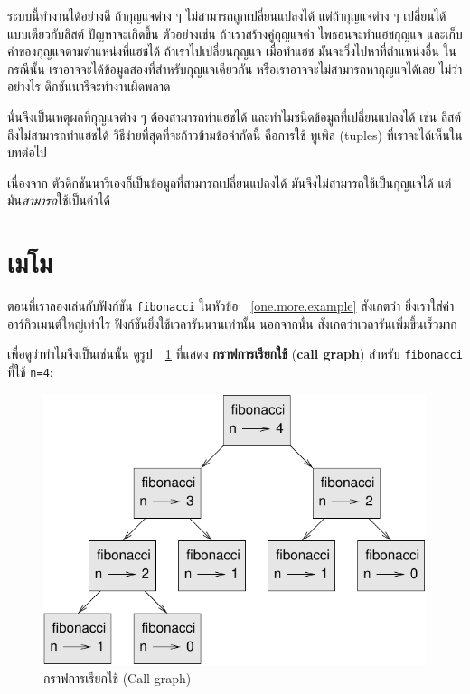ระบบนี้ทำงานได้อย่างดี ถ้ากุญแจต่าง ๆ ไม่สามารถถูกเปลี่ยนแปลงได้
แต่ถ้ากุญแจต่าง ๆ เปลี่ยนได้แบบเดียวกับลิสต์ ปัญหาจะเกิดขึ้น
ตัวอย่างเช่น ถ้าเราสร้างคู่กุญแจค่า
ไพธอนจะทำแฮชกุญแจ และเก็บค่าของกุญแจตามตำแหน่งที่แฮชได้
ถ้าเราไปเปลี่ยนกุญแจ เมื่อทำแฮช มันจะวิ่งไปหาที่ตำแหน่งอื่น
ในกรณีนั้น เราอาจจะได้ข้อมูลสองที่สำหรับกุญแจเดียวกัน
หรือเราอาจจะไม่สามารถหากุญแจได้เลย
ไม่ว่าอย่างไร ดิกชันนารีจะทำงานผิดพลาด

นั่นจึงเป็นเหตุผลที่กุญแจต่าง ๆ ต้องสามารถทำแฮชได้ และทำไมชนิดข้อมูลที่เปลี่ยนแปลงได้  เช่น ลิสต์ถึงไม่สามารถทำแฮชได้
วิธีง่ายที่สุดที่จะก้าวข้ามข้อจำกัดนี้ คือการใช้ ทูเพิล (tuples) ที่เราจะได้เห็นในบทต่อไป

เนื่องจาก ตัวดิกชันนารีเองก็เป็นข้อมูลที่สามารถเปลี่ยนแปลงได้
มันจึงไม่สามารถใช้เป็นกุญแจได้
แต่มัน\emph{สามารถ}ใช้เป็นค่าได้

\section{เมโม}
\label{memoize}

ตอนที่เราลองเล่นกับฟังก์ชัน \texttt{fibonacci} ในหัวข้อ~~\ref{one.more.example}
สังเกตว่า ยิ่งเราใส่ค่าอาร์กิวเมนต์ใหญ่เท่าไร 
ฟังก์ชันยิ่งใช้เวลารันนานเท่านั้น
%
นอกจากนั้น สังเกตว่าเวลารันเพิ่มขึ้นเร็วมาก

เพื่อดูว่าทำไมจึงเป็นเช่นนั้น
ดูรูป~~\ref{fig.fibonacci} ที่แสดง \textbf{กราฟการเรียกใช้} (\textbf{call graph}) สำหรับ \texttt{fibonacci} ที่ใช้ \texttt{n=4}:

\begin{figure}
\centerline
{\includegraphics[scale=0.7]{figs/fibonacci.pdf}}
\caption{กราฟการเรียกใช้ (Call graph)}
\label{fig.fibonacci}
\end{figure}

